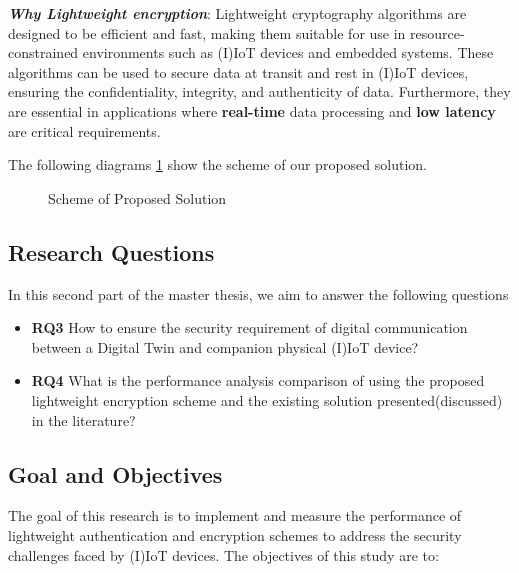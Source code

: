 \textbf{\textit{Why Lightweight encryption}}:
Lightweight cryptography algorithms are designed to be efficient and fast, making them suitable for use in resource-constrained environments such as (I)IoT devices and embedded systems.
These algorithms can be used to secure data at transit and rest in (I)IoT devices, ensuring the confidentiality, integrity, and authenticity of data. Furthermore, they are essential in applications where \textbf{real-time} data processing and \textbf{low latency} are critical requirements.

The following diagrams \ref{fig:ps-archi} show the scheme of our proposed solution. 

\begin{figure}[H]
    \caption{Scheme of Proposed Solution}
    \centering
    
    \label{fig:ps-archi}
\end{figure}


\subsection{Research Questions}
In this second part of the master thesis, we aim to answer the following questions 
\begin{itemize}
    \item \textbf{RQ3} How to ensure the security requirement of digital communication between a Digital Twin and companion physical (I)IoT device?
    \item \textbf{RQ4} What is the performance analysis comparison of using the proposed lightweight encryption scheme and the existing solution presented(discussed) in the literature?
\end{itemize}


\subsection{Goal and Objectives}
The goal of this research is to implement and measure the performance of lightweight authentication and encryption schemes to address the security challenges faced by (I)IoT devices. The objectives of this study are to:

